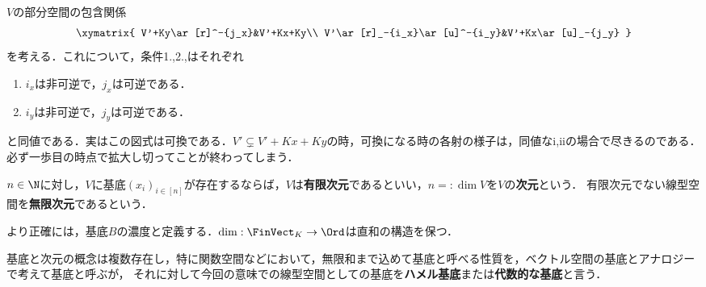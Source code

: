 \documentclass[uplatex, dvipdfmx]{jsreport}
\begin{document}
\begin{remark}
    $V$の部分空間の包含関係
    \[\xymatrix{
        V'+Ky\ar[r]^-{j_x}&V'+Kx+Ky\\
        V'\ar[r]_-{i_x}\ar[u]^-{i_y}&V'+Kx\ar[u]_-{j_y}
    }\]
    を考える．これについて，条件1.,2.,はそれぞれ
    \begin{enumerate}[i]
        \item $i_x$は非可逆で，$j_x$は可逆である．
        \item $i_y$は非可逆で，$j_y$は可逆である．
    \end{enumerate}
    と同値である．実はこの図式は可換である．$V'\subsetneq V'+Kx+Ky$の時，可換になる時の各射の様子は，同値なi,iiの場合で尽きるのである．必ず一歩目の時点で拡大し切ってことが終わってしまう．
\end{remark}

\begin{definition}\label{def-dimention}
    $n\in\N$に対し，$V$に基底$(x_i)_{i\in[n]}$が存在するならば，$V$は\textbf{有限次元}であるといい，$n=:\dim V$を$V$の\textbf{次元}という．
    有限次元でない線型空間を\textbf{無限次元}であるという．
\end{definition}
\begin{remark}
    より正確には，基底$B$の濃度と定義する．$\dim:\FinVect_K\to\Ord$は直和の構造を保つ．

    基底と次元の概念は複数存在し，特に関数空間などにおいて，無限和まで込めて基底と呼べる性質を，ベクトル空間の基底とアナロジーで考えて基底と呼ぶが，
    それに対して今回の意味での線型空間としての基底を\textbf{ハメル基底}または\textbf{代数的な基底}と言う．
\end{remark}
\end{document}
